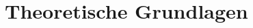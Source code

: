 \documentclass[../main.tex]{subfiles}
\begin{document}
  \section{Theoretische Grundlagen}
\end{document}
